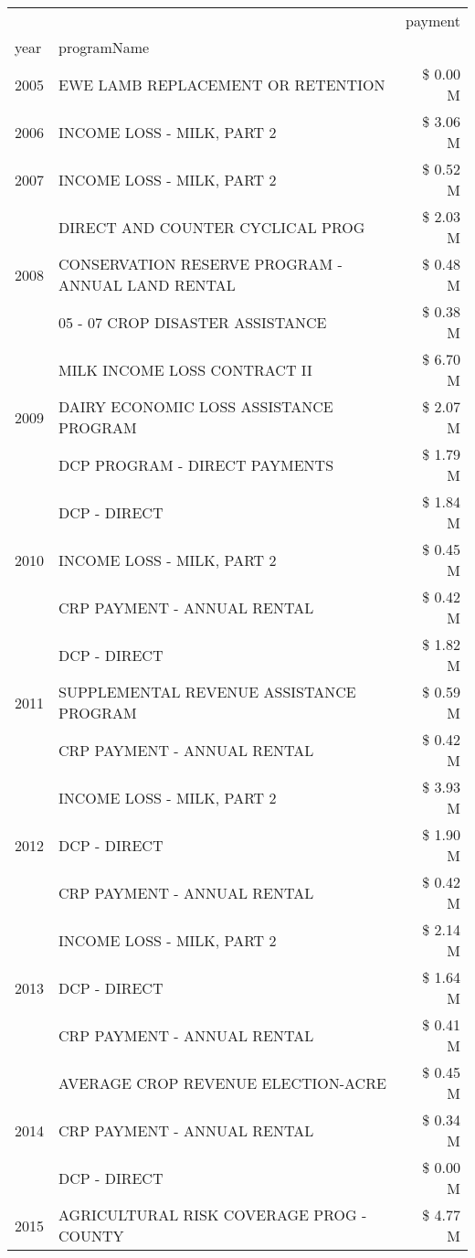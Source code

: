\begin{tabular}{llr}
\toprule
 &  & payment \\
year & programName &  \\
\midrule
2005 & EWE LAMB REPLACEMENT OR RETENTION & \$ 0.00 M \\
\cline{1-3}
2006 & INCOME LOSS - MILK, PART 2 & \$ 3.06 M \\
\cline{1-3}
2007 & INCOME LOSS - MILK, PART 2 & \$ 0.52 M \\
\cline{1-3}
\multirow[t]{3}{*}{2008} & DIRECT AND COUNTER CYCLICAL PROG & \$ 2.03 M \\
 & CONSERVATION RESERVE PROGRAM - ANNUAL LAND RENTAL & \$ 0.48 M \\
 & 05 - 07 CROP DISASTER ASSISTANCE & \$ 0.38 M \\
\cline{1-3}
\multirow[t]{3}{*}{2009} & MILK INCOME LOSS CONTRACT II & \$ 6.70 M \\
 & DAIRY ECONOMIC LOSS ASSISTANCE PROGRAM & \$ 2.07 M \\
 & DCP PROGRAM - DIRECT PAYMENTS & \$ 1.79 M \\
\cline{1-3}
\multirow[t]{3}{*}{2010} & DCP - DIRECT & \$ 1.84 M \\
 & INCOME LOSS - MILK, PART 2 & \$ 0.45 M \\
 & CRP PAYMENT - ANNUAL RENTAL & \$ 0.42 M \\
\cline{1-3}
\multirow[t]{3}{*}{2011} & DCP - DIRECT & \$ 1.82 M \\
 & SUPPLEMENTAL REVENUE ASSISTANCE PROGRAM & \$ 0.59 M \\
 & CRP PAYMENT - ANNUAL RENTAL & \$ 0.42 M \\
\cline{1-3}
\multirow[t]{3}{*}{2012} & INCOME LOSS - MILK, PART 2 & \$ 3.93 M \\
 & DCP - DIRECT & \$ 1.90 M \\
 & CRP PAYMENT - ANNUAL RENTAL & \$ 0.42 M \\
\cline{1-3}
\multirow[t]{3}{*}{2013} & INCOME LOSS - MILK, PART 2 & \$ 2.14 M \\
 & DCP - DIRECT & \$ 1.64 M \\
 & CRP PAYMENT - ANNUAL RENTAL & \$ 0.41 M \\
\cline{1-3}
\multirow[t]{3}{*}{2014} & AVERAGE CROP REVENUE ELECTION-ACRE & \$ 0.45 M \\
 & CRP PAYMENT - ANNUAL RENTAL & \$ 0.34 M \\
 & DCP - DIRECT & \$ 0.00 M \\
\cline{1-3}
\multirow[t]{3}{*}{2015} & AGRICULTURAL RISK COVERAGE PROG - COUNTY & \$ 4.77 M \\

\end{tabular}
